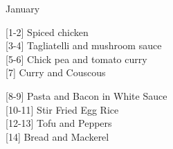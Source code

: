 
    
		\begin{menu}{January}
    
    \begin{recipelist}
    
        {\scriptsize[1-2]} Spiced chicken\\
        {\scriptsize[3-4]} Tagliatelli and mushroom sauce\\
        {\scriptsize[5-6]} Chick pea and tomato curry\\
        {\scriptsize[7]} Curry and Couscous\\%
    \end{recipelist}%
    \begin{recipelist}
    
        {\scriptsize[8-9]} Pasta and Bacon in White Sauce\\
        {\scriptsize[10-11]} Stir Fried Egg Rice\\
        {\scriptsize[12-13]} Tofu and Peppers\\
        {\scriptsize[14]} Bread and Mackerel\\%
    \end{recipelist}\par%
  

\end{menu}

